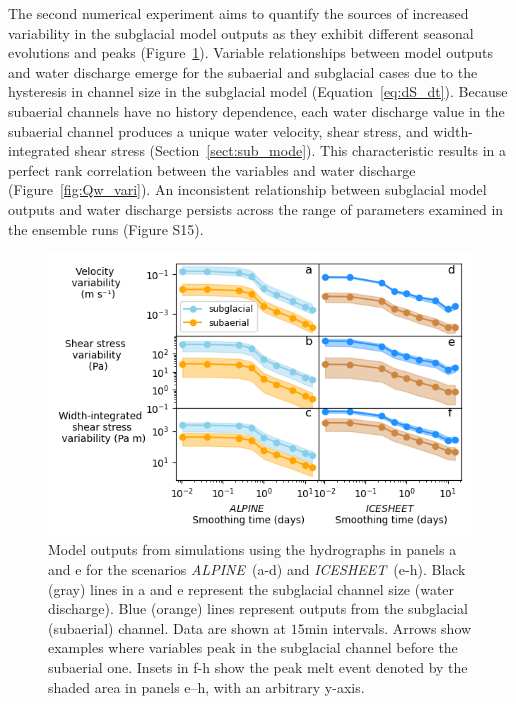 \documentclass[esurf, manuscript]{copernicus}
\newcommand{\alpine}{\textit{ALPINE}\,}
\newcommand{\icesheet}{\textit{ICESHEET}\,}
\begin{document}
The second numerical experiment aims to quantify the sources of increased variability in the subglacial model outputs as they exhibit different seasonal evolutions and peaks (Figure~\ref{fig:model_outs}).
Variable relationships between model outputs and water discharge emerge for the subaerial and subglacial cases due to the hysteresis in channel size in the subglacial model (Equation~\ref{eq:dS_dt}).
Because subaerial channels have no history dependence, each water discharge value in the subaerial channel produces a unique water velocity, shear stress, and width-integrated shear stress (Section~\ref{sect:sub_mode}).
This characteristic results in a perfect rank correlation between the variables and water discharge (Figure~\ref{fig:Qw_vari}).
An inconsistent relationship between subglacial model outputs and water discharge persists across the range of parameters examined in the ensemble runs (Figure S15).
\begin{figure}[hbt!]
  \centering
  \includegraphics[width=0.9\linewidth]{Fig5.png}
  \caption{Model outputs from simulations using the hydrographs in panels a and e for the scenarios \alpine{} (a-d) and \icesheet{} (e-h).
    Black (gray) lines in a and e represent the subglacial channel size (water discharge).
    Blue (orange) lines represent outputs from the subglacial (subaerial) channel.
    Data are shown at $15$\unit{min} intervals.
    Arrows show examples where variables peak in the subglacial channel before the subaerial one.
    Insets in f-h show the peak melt event denoted by the shaded area in panels e--h, with an arbitrary y-axis.
  }
  \label{fig:model_outs}
\end{figure}
\end{document}
